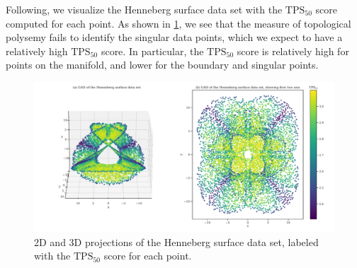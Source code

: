 Following, we visualize the Henneberg surface data set with the $\text{TPS}_{50}$ score computed for each point. As shown in \cref{fig:gad-henneberg-3d-tps-50}, we see that the measure of topological polysemy fails to identify the singular data points, which we expect to have a relatively high $\text{TPS}_{50}$ score. In particular, the $\text{TPS}_{50}$ score is relatively high for points on the manifold, and lower for the boundary and singular points.
\begin{figure}[H]
    \centering
    \includegraphics[width=\textwidth]{thesis/figures/gad-henneberg-3d-tps-50.pdf}
    \caption{2D and 3D projections of the Henneberg surface data set, labeled with the $\text{TPS}_{50}$ score for each point.}
    \label{fig:gad-henneberg-3d-tps-50}
\end{figure}

